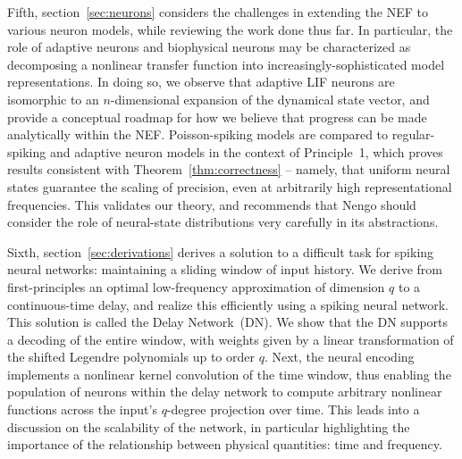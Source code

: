 Fifth, section~\ref{sec:neurons} considers the challenges in extending the NEF to various neuron models, while reviewing the work done thus far.
In particular, the role of adaptive neurons and biophysical neurons may be characterized as decomposing a nonlinear transfer function into increasingly-sophisticated model representations.
In doing so, we observe that adaptive LIF neurons are isomorphic to an $n$-dimensional expansion of the dynamical state vector, and provide a conceptual roadmap for how we believe that progress can be made analytically within the NEF.
Poisson-spiking models are compared to regular-spiking and adaptive neuron models in the context of Principle~1, which proves results consistent with Theorem~\ref{thm:correctness} -- namely, that uniform neural states guarantee the scaling of precision, even at arbitrarily high representational frequencies.
This validates our theory, and recommends that Nengo should consider the role of neural-state distributions very carefully in its abstractions.

Sixth, section~\ref{sec:derivations} derives a solution to a difficult task for spiking neural networks: maintaining a sliding window of input history.
We derive from first-principles an optimal low-frequency approximation of dimension $q$ to a continuous-time delay, and realize this efficiently using a spiking neural network.
This solution is called the Delay Network~(DN).
We show that the DN supports a decoding of the entire window, with weights given by a linear transformation of the shifted Legendre polynomials up to order $q$.
Next, the neural encoding implements a nonlinear kernel convolution of the time window, thus enabling the population of neurons within the delay network to compute arbitrary nonlinear functions across the input's $q$-degree projection over time.
This leads into a discussion on the scalability of the network, in particular highlighting the importance of the relationship between physical quantities: time and frequency.

